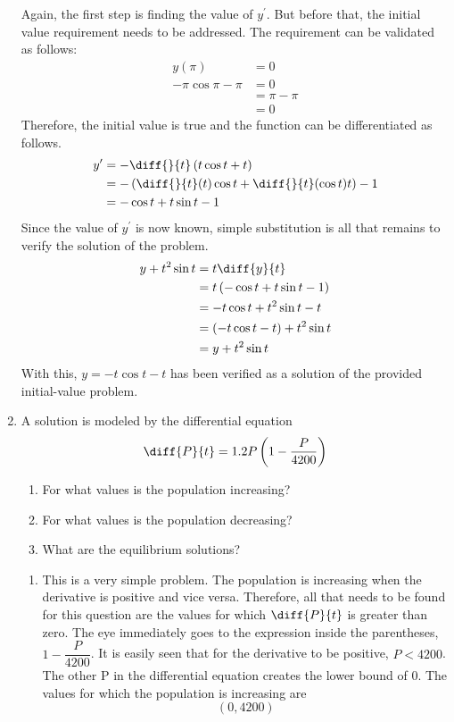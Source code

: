 \documentclass{article}
\begin{document}
\begin{enumerate}[label=\textbf{\arabic*.}]
\vspace{5pt}
Again, the first step is finding the value of $y^\prime$. But before that, the initial value requirement needs to be addressed. The requirement can be validated as follows:
\begin{align*}
y(\pi)&=0\\
-\pi\cos\pi-\pi &= 0\\
&=\pi-\pi\\
&= 0
\end{align*}
Therefore, the initial value is true and the function can be differentiated as follows.
\begin{align*}
y^\prime &= -\diff{}{t}\left(t\cos t+t\right)\\
&= -\left(\diff{}{t}(t)\cos t + \diff{}{t}(\cos t) t\right)-1\\
&= -\cos t +t\sin t-1
\end{align*}
Since the value of $y^\prime$ is now known, simple substitution is all that remains to verify the solution of the problem.
\begin{align*}
y+t^2\sin t &= t\diff{y}{t}\\
&= t\left(-\cos t + t\sin t -1\right)\\
&= -t\cos t+t^2\sin t -t\\
&= \left(-t\cos t-t\right)+t^2\sin t\\
&= y +t^2\sin t
\end{align*}
With this, $y = -t\cos t - t$ has been verified as a solution of the provided initial-value problem.

\newpage 

\item A solution is modeled by the differential equation 
\[\diff{P}{t} = 1.2P\left(1-\dfrac{P}{4200}\right)\]
\begin{enumerate}[label = (\alph*)]
\item For what values is the population increasing?
\item For what values is the population decreasing?
\item What are the equilibrium solutions?
\end{enumerate}


\vspace{5pt}
\begin{enumerate}[label = (\alph*)]
\item This is a very simple problem. The population is increasing when the derivative is positive and vice versa. Therefore, all that needs to be found for this question are the values for which $\diff{P}{t}$ is greater than zero. The eye immediately goes to the expression inside the parentheses, $1-\dfrac{P}{4200}$. It is easily seen that for the derivative to be positive, $P<4200$. The other P in the differential equation creates the lower bound of 0. The values for which the population is increasing are \[(0,4200)\]


\end{enumerate}
\end{enumerate}
\end{document}
